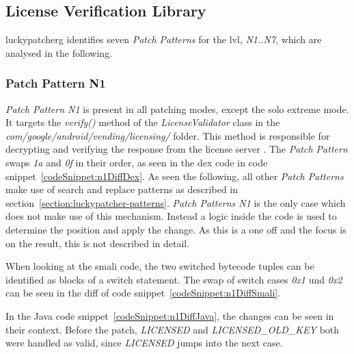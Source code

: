 \subsection{License Verification Library}
\gls{luckypatcherg} identifies seven \textit{Patch Patterns} for the \gls{lvl}, \textit{N1..N7}, which are analysed in the following.

\subsubsection{Patch Pattern N1}
\textit{Patch Pattern N1} is present in all patching modes, except the solo extreme mode.
It targets the \textit{verify()} method of the \textit{LicenseValidator} class in the \textit{com/google/android/vending/licensing/} folder.
This method is responsible for decrypting and verifying the response from the license server \cite{developersLicensingReference}.
\newline
The \textit{Patch Pattern} swaps \textit{1a} and \textit{0f} in their order, as seen in the dex code in code snippet~\ref{codeSnippet:n1DiffDex}.
\newline
As seen the following, all other \textit{Patch Patterns} make use of search and replace patterns as described in section~\ref{section:luckypatcher-patterns}.
\textit{Patch Patterns N1} is the only case which does not make use of this mechanism.
Instead a logic inside the code is used to determine the position and apply the change.
As this is a one off and the focus is on the result, this is not described in detail.
\newline

When looking at the smali code, the two switched bytecode tuples can be identified as blocks of a switch statement.
The swap of switch cases \textit{0x1} und \textit{0x2} can be seen in the diff of code snippet~\ref{codeSnippet:n1DiffSmali}.
\newline

In the Java code snippet~\ref{codeSnippet:n1DiffJava}, the changes can be seen in their context.
Before the patch, \textit{LICENSED} and \textit{LICENSED\_OLD\_KEY} both were handled as valid, since \textit{LICENSED} jumps into the next case.
